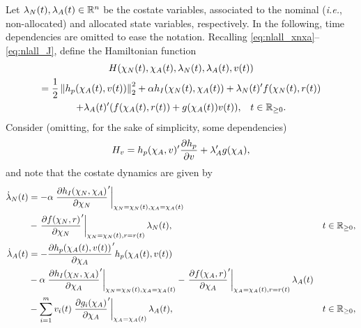 Let $\lambda_N(t),\lambda_A(t)\in\mathbb{R}^{n}$ be the costate variables, associated to the nominal (\emph{i.e.}, non-allocated) and allocated state variables, respectively. In the following, time dependencies are omitted to ease the notation. Recalling \eqref{eq:nlall_xnxa}--\eqref{eq:nlall_J}, define the Hamiltonian function
\begin{multline}
  \label{eq:nlall_H}
  H(\chi_N(t),\chi_A(t),\lambda_N(t),\lambda_A(t),v(t)) \\
  =\frac{1}{2}\left\Vert h_p(\chi_A(t),v(t)) \right\Vert_2^2 + \alpha h_I(\chi_N(t),\chi_A(t)) + \lambda_N(t)'f(\chi_N(t),r(t)) \\
  \begin{aligned}+ \lambda_A(t)'(f(\chi_A(t),r(t)) + g(\chi_A(t))v(t)), && t\in\mathbb{R}_{\geq 0}.\end{aligned}
\end{multline}
Consider (omitting, for the sake of simplicity, some dependencies)
\begin{equation}
  \label{eq:nlall_dHdv}
  H_v = h_p(\chi_A,v)'\frac{\partial h_p}{\partial v} + \lambda_A'g(\chi_A),
\end{equation}
and note that the costate dynamics are given by
\begin{subequations}
  \label{eq:nlall_lambdadot}
  \begin{align}
    \dot{\lambda}_N(t) &= -\alpha\left.\frac{\partial h_I(\chi_N,\chi_A)}{\partial \chi_N}'\right|_{\chi_N=\chi_N(t),\chi_A=\chi_A(t)}\notag\\
    &- \left.\frac{\partial f(\chi_N,r)}{\partial \chi_N}'\right|_{\chi_N=\chi_N(t),r=r(t)}\lambda_N(t), & t\in\mathbb{R}_{\geq 0},\label{eq:nlal_lambdandot}\\
    \dot{\lambda}_A(t) &= -\frac{\partial h_p(\chi_A(t),v(t))}{\partial \chi_A}'h_p(\chi_A(t),v(t))\notag\\
    &- \alpha\left.\frac{\partial h_I(\chi_N,\chi_A)}{\partial \chi_A}'\right|_{\chi_N=\chi_N(t),\chi_A=\chi_A(t)} - \left.\frac{\partial f(\chi_A,r)}{\partial \chi_A}'\right|_{\chi_A=\chi_A(t),r=r(t)}\lambda_A(t)\notag\\
    &- \sum_{i=1}^{m}v_i(t)\left.\frac{\partial g_i(\chi_A)}{\partial \chi_A}'\right|_{\chi_A=\chi_A(t)}\lambda_A(t), & t\in\mathbb{R}_{\geq 0},\label{eq:nlall_lambdaadot}
  \end{align}
\end{subequations}
